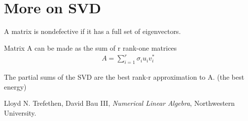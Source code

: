 \documentclass[11pt]{article}
\begin{document}
\section{More on SVD}


A matrix is nondefective if it has a full set of eigenvectors.

\begin{theorem}
  Matrix A can be made as the sum of r rank-one matrices
  \begin{align*}
    A = \sum_{i=1}^r \sigma_i u_i v_i^*
  \end{align*}
\end{theorem}
The partial sums of the SVD are the best rank-r approximation to A. (the best energy)

%


\begin{thebibliography}{77}

Lloyd N. Trefethen, David Bau III,
\emph{Numerical Linear Algebra},
Northwestern University.


\end{thebibliography}
\end{document}
